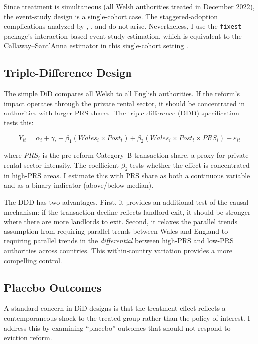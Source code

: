 \documentclass[12pt]{article}
\begin{document}
Since treatment is simultaneous (all Welsh authorities treated in December 2022), the event-study design is a single-cohort case. The staggered-adoption complications analyzed by \citet{callaway2021difference}, \citet{sun2021estimating}, and \citet{dechaisemartin2020two} do not arise. Nevertheless, I use the \texttt{fixest} package's interaction-based event study estimation, which is equivalent to the Callaway--Sant'Anna estimator in this single-cohort setting \citep{borusyak2024revisiting}.

\subsection{Triple-Difference Design}

The simple DiD compares all Welsh to all English authorities. If the reform's impact operates through the private rental sector, it should be concentrated in authorities with larger PRS shares. The triple-difference (DDD) specification tests this:

\begin{equation}
\label{eq:ddd}
Y_{it} = \alpha_i + \gamma_t + \beta_1 (\mathit{Wales}_i \times \mathit{Post}_t) + \beta_2 (\mathit{Wales}_i \times \mathit{Post}_t \times \mathit{PRS}_i) + \varepsilon_{it}
\end{equation}

\noindent where $\mathit{PRS}_i$ is the pre-reform Category~B transaction share, a proxy for private rental sector intensity. The coefficient $\beta_2$ tests whether the effect is concentrated in high-PRS areas. I estimate this with PRS share as both a continuous variable and as a binary indicator (above/below median).

The DDD has two advantages. First, it provides an additional test of the causal mechanism: if the transaction decline reflects landlord exit, it should be stronger where there are more landlords to exit. Second, it relaxes the parallel trends assumption from requiring parallel trends between Wales and England to requiring parallel trends in the \textit{differential} between high-PRS and low-PRS authorities across countries. This within-country variation provides a more compelling control.

\subsection{Placebo Outcomes}

A standard concern in DiD designs is that the treatment effect reflects a contemporaneous shock to the treated group rather than the policy of interest. I address this by examining ``placebo'' outcomes that should not respond to eviction reform.
\end{document}

